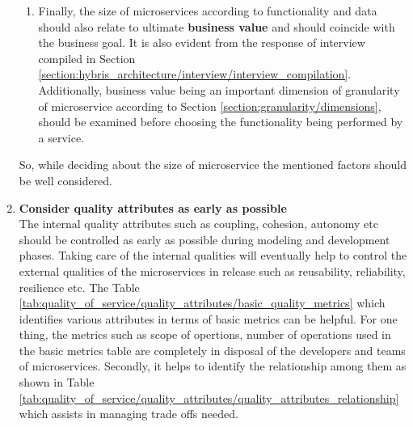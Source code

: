 \begin{enumerate}
\begin{enumerate}
\item Finally, the size of microservices according to functionality and data should also relate to ultimate \textbf{business value} and should coincide with the business goal. It is also evident from the response of interview compiled in Section \ref{section:hybris_architecture/interview/interview_compilation}. Additionally, business value being an important dimension of granularity of microservice according to Section \ref{section:granularity/dimensions}, should be examined before choosing the functionality being performed by a service.
\end{enumerate}
So, while deciding about the size of microservice the mentioned factors should be well considered.

\item \textbf{Consider quality attributes as early as possible} \\
The internal quality attributes such as coupling, cohesion, autonomy etc should be controlled as early as possible during modeling and development phases. Taking care of the internal qualities will eventually help to control the external qualities of the microservices in release such as reusability, reliability, resilience etc. The Table \ref{tab:quality_of_service/quality_attributes/basic_quality_metrics} which identifies various attributes in terms of basic metrics can be helpful. For one thing, the metrics such as scope of opertions, number of operations used in the basic metrics table are completely in disposal of the developers and teams of microservices. Secondly, it helps to identify the relationship among them as shown in Table \ref{tab:quality_of_service/quality_attributes/quality_attributes_relationship} which assists in managing trade offs needed.


\end{enumerate}
